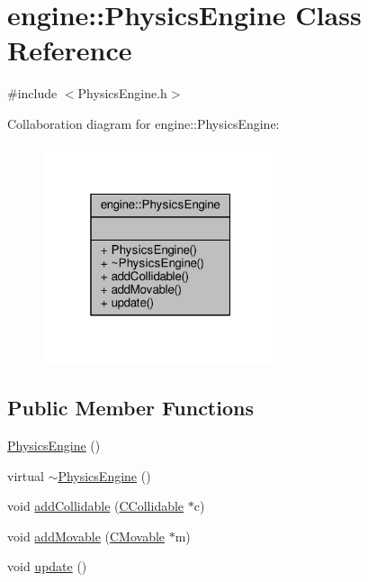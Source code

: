 \hypertarget{classengine_1_1PhysicsEngine}{\section{engine\-:\-:Physics\-Engine Class Reference}
\label{classengine_1_1PhysicsEngine}
}


{\ttfamily \#include $<$Physics\-Engine.\-h$>$}



Collaboration diagram for engine\-:\-:Physics\-Engine\-:\nopagebreak
\begin{figure}[H]
\begin{center}
\leavevmode
\includegraphics[width=196pt]{classengine_1_1PhysicsEngine__coll__graph}
\end{center}
\end{figure}
\subsection*{Public Member Functions}
\begin{DoxyCompactItemize}
\item 
\hyperlink{classengine_1_1PhysicsEngine_a14c98b9b2eae12bff267b99df27ac9fc}{Physics\-Engine} ()
\item 
virtual \hyperlink{classengine_1_1PhysicsEngine_a7b708ba5517fdd9cc95c977dde7ff4ab}{$\sim$\-Physics\-Engine} ()
\item 
void \hyperlink{classengine_1_1PhysicsEngine_a609b1b5b818d7865c9b20abfe07e26e8}{add\-Collidable} (\hyperlink{classengine_1_1CCollidable}{C\-Collidable} $\ast$c)
\item 
void \hyperlink{classengine_1_1PhysicsEngine_a32690f48a5df0b98c5f326c0b11414ba}{add\-Movable} (\hyperlink{classengine_1_1CMovable}{C\-Movable} $\ast$m)
\item 
void \hyperlink{classengine_1_1PhysicsEngine_a468ef9599ccd80e7e5c170d741ab1d21}{update} ()
\end{DoxyCompactItemize}


